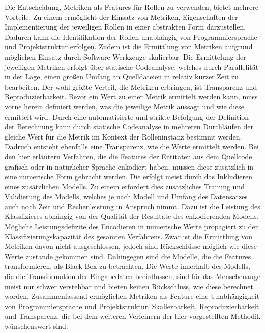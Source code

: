 Die Entscheidung, Metriken als Features für Rollen zu verwenden, bietet mehrere Vorteile. Zu einem ermöglicht der Einsatz von Metriken, Eigenschaften der Implementierung der jeweiligen Rollen in einer abstrakten Form darzustellen.
Dadurch kann die Identifikation der Rollen unabhängig von Programmiersprache und Projektstruktur erfolgen. Zudem ist die Ermittlung von Metriken aufgrund möglichen Einsatz durch Software-Werkzeuge skalierbar. Die Ermittelung der jeweiligen Metriken erfolgt über statische Codeanalyse, welches durch Parallelität in der Lage,
einen großen Umfang an Quelldateien in relativ kurzer Zeit zu bearbeiten. Der wohl größte Verteil, die Metriken erbringen, ist Transparenz und Reproduzierbarkeit.
Bevor ein Wert zu einer Metrik ermittelt werden kann, muss vorne herein definiert werden, was die jeweilige Metrik aussagt und wie diese ermittelt wird. Durch eine automatisierte und strikte Befolgung der Definition der Berechnung kann durch statische Codeanalyse in mehreren Durchläufen der gleiche Wert für die Metrik im Kontext der Rolleninstanz bestimmt werden.
Dadruch entsteht ebenfalls eine Transparenz, wie die Werte ermittelt werden. Bei den hier erläutern Verfahren, die die Features der Entitäten aus dem Quellcode grafisch oder in natürlicher Sprache enkodiert haben, müssen diese zusätzlich in eine numerische Form gebracht werden.
Die erfolgt meist durch das Inkludieren eines zusätzlichen Modells. Zu einem erfordert dies zusätzliches Training und Validierung des Modells, welches je nach Modell und Umfang des Datensatzes auch noch Zeit und Rechenleistung in Anspruch nimmt. Dazu ist die Leistung des Klassfizieres abhängig von der Qualität der Resultate des enkodierenden Modells. Mögliche Leistungsdefizite des Encodieren in numerische Werte propagiert zu der Klassifizierungskapazität des gesamten Verfahrens.
Zwar ist die Ermittlung von Metriken davon nicht ausgeschlossen, jedoch sind Rückschlüsse möglich wie diese Werte zustande gekommen sind. Dahingegen sind die Modelle, die die Features transformieren, als Black Box zu betrachten. Die Werte innerhalb des Modells, die die Transformation der Eingabedaten beeinflussen, sind für das Menschenauge meist nur schwer verstehbar und bieten keinen Rückschluss, wie diese berechnet worden.
Zusammenfassend ermöglichen Metriken als Feature eine Unabhängigkeit von Programmiersprache und Projektstruktur, Skalierbarkeit, Reproduzierbarkeit und Transparenz, die bei dem weiteren Verfeinern der hier vorgestellten Methodik wünschenswert sind.

\pagebreak

